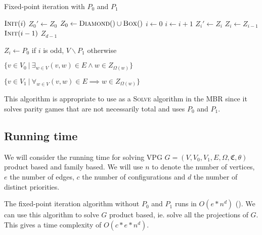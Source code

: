 \begin{algorithm}
	\caption{Fixed-point iteration with $P_0$ and $P_1$}
	\label{alg_FPITE}
	\begin{multicols}{2}
		\begin{algorithmic}[1]
					\State $\textsc{Init}(i)$
				\EndFor
				\Repeat
					\State $Z_0'\gets Z_0$
					\State $Z_0 \gets \textsc{Diamond}() \cup \textsc{Box}()$
					\State $i \gets 0$
						\State $i \gets i+1$
						\State $Z_i' \gets Z_i$
						\State $Z_i \gets Z_{i-1}$
						\State $\textsc{Init}(i-1)$
					\EndWhile
				\State \Return $Z_{d-1}$
			\EndFunction
		\end{algorithmic}\bigskip\bigskip
		\begin{algorithmic}[1]
			\Function{Init}{$i$}
				\State $Z_i \gets P_0$ if $i$ is odd, $V\backslash P_1$ otherwise
			\EndFunction
		\end{algorithmic}\bigskip
		\begin{algorithmic}[1]
			\Function{Diamond}{}
				\State \Return $\{ v \in V_0\ |\ \exists_{w\in V} (v,w) \in E \wedge w \in Z_{\Omega(w)}\}$
			\EndFunction
		\end{algorithmic}\bigskip
		\begin{algorithmic}[1]
			\Function{Box}{}
			\State \Return $\{ v \in V_1\ |\ \forall_{w\in V} (v,w) \in E \implies w \in Z_{\Omega(w)}\}$
			\EndFunction
		\end{algorithmic}
	\end{multicols}
\end{algorithm}

This algorithm is appropriate to use as a \textsc{Solve} algorithm in the \textsc{MBR} since it solves parity games that are not necessarily total and uses $P_0$ and $P_1$.

\subsection{Running time}
We will consider the running time for solving VPG $G = (V,V_0,V_1,E,\Omega,\mathfrak{C},\theta)$ product based and family based. We will use $n$ to denote the number of vertices, $e$ the number of edges, $c$ the number of configurations and $d$ the number of distinct priorities.

The fixed-point iteration algorithm without $P_0$ and $P_1$ runs in $O(e*n^d)$ (\cite{FPITE}). We can use this algorithm to solve $G$ product based, ie. solve all the projections of $G$. This gives a time complexity of $O(c*e*n^d)$.

